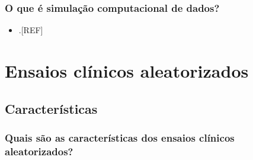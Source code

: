 \documentclass[
]{book}
\providecommand{\tightlist}{%
  \setlength{\itemsep}{0pt}\setlength{\parskip}{0pt}}
\begin{document}
\hypertarget{o-que-uxe9-simulauxe7uxe3o-computacional-de-dados}{%
\subsection{O que é simulação computacional de dados?}\label{o-que-uxe9-simulauxe7uxe3o-computacional-de-dados}}

\begin{itemize}
\tightlist
\item
  .{[}REF{]}
\end{itemize}

\hypertarget{ensaios-cluxednicos-aleatorizados}{%
\chapter{\texorpdfstring{\textbf{Ensaios clínicos aleatorizados}}{Ensaios clínicos aleatorizados}}\label{ensaios-cluxednicos-aleatorizados}}

\hypertarget{caracteristicas}{%
\section{Características}\label{caracteristicas}}

\hypertarget{quais-suxe3o-as-caracteruxedsticas-dos-ensaios-cluxednicos-aleatorizados}{%
\subsection{Quais são as características dos ensaios clínicos aleatorizados?}\label{quais-suxe3o-as-caracteruxedsticas-dos-ensaios-cluxednicos-aleatorizados}}
\end{document}
